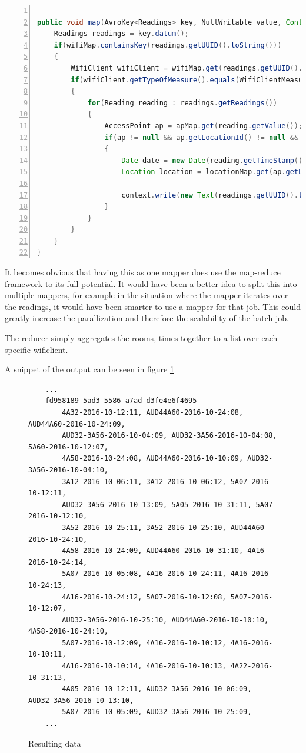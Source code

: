  \begin{lstlisting}[frame=single, backgroundcolor=\color{light-gray}, basicstyle=\footnotesize\ttfamily, language=Java, numbers=left, numberstyle=\tiny \color{black}, breaklines=true, label=code:project2_mapper]
 
public void map(AvroKey<Readings> key, NullWritable value, Context context) throws IOException, InterruptedException {
    Readings readings = key.datum();
    if(wifiMap.containsKey(readings.getUUID().toString()))
	{
        WifiClient wifiClient = wifiMap.get(readings.getUUID().toString());
		if(wifiClient.getTypeOfMeasure().equals(WifiClientMeasure.AccessPoint))
		{
		    for(Reading reading : readings.getReadings())
			{
				AccessPoint ap = apMap.get(reading.getValue());
				if(ap != null && ap.getLocationId() != null && locationMap.containsKey(ap.getLocationId()))
				{
					Date date = new Date(reading.getTimeStamp());
					Location location = locationMap.get(ap.getLocationId());
					 
					context.write(new Text(readings.getUUID().toString()), new Text(location.getRoom() + "-" + dateFormat.format(date)));
				}
			}
		}
	}
}
\end{lstlisting}

It becomes obvious that having this as one mapper does use the map-reduce framework to its full potential. It would have been a better idea to split this into multiple mappers, for example in the situation where the mapper iterates over the readings, it would have been smarter to use a mapper for that job. This could greatly increase the parallization and therefore the scalability of the batch job.

The reducer simply aggregates the rooms, times together to a list over each specific wificlient.

A snippet of the output can be seen in figure \ref{fig:result_data}
\begin{figure}[p]
	\caption{Resulting data}
	\label{fig:result_data}
	\begin{verbatim}
	...
	fd958189-5ad3-5586-a7ad-d3fe4e6f4695	
	    4A32-2016-10-12:11, AUD44A60-2016-10-24:08, AUD44A60-2016-10-24:09, 
	    AUD32-3A56-2016-10-04:09, AUD32-3A56-2016-10-04:08, 5A60-2016-10-12:07, 
	    4A58-2016-10-24:08, AUD44A60-2016-10-10:09, AUD32-3A56-2016-10-04:10, 
	    3A12-2016-10-06:11, 3A12-2016-10-06:12, 5A07-2016-10-12:11, 
	    AUD32-3A56-2016-10-13:09, 5A05-2016-10-31:11, 5A07-2016-10-12:10,
	    3A52-2016-10-25:11, 3A52-2016-10-25:10, AUD44A60-2016-10-24:10,
	    4A58-2016-10-24:09, AUD44A60-2016-10-31:10, 4A16-2016-10-24:14,
	    5A07-2016-10-05:08, 4A16-2016-10-24:11, 4A16-2016-10-24:13,
	    4A16-2016-10-24:12, 5A07-2016-10-12:08, 5A07-2016-10-12:07,
	    AUD32-3A56-2016-10-25:10, AUD44A60-2016-10-10:10, 4A58-2016-10-24:10,
	    5A07-2016-10-12:09, 4A16-2016-10-10:12, 4A16-2016-10-10:11,
	    4A16-2016-10-10:14, 4A16-2016-10-10:13, 4A22-2016-10-31:13,
	    4A05-2016-10-12:11, AUD32-3A56-2016-10-06:09, AUD32-3A56-2016-10-13:10,
	    5A07-2016-10-05:09, AUD32-3A56-2016-10-25:09,
	...
	\end{verbatim}
\end{figure}

